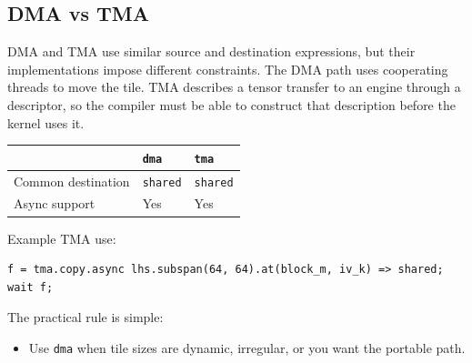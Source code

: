 \subsection*{DMA vs TMA}

DMA and TMA use similar source and destination expressions, but their implementations impose different constraints. The DMA path uses cooperating threads to move the tile. TMA describes a tensor transfer to an engine through a descriptor, so the compiler must be able to construct that description before the kernel uses it.

\begin{table}[htbp]
\centering\small
\begin{tabularx}{\linewidth}{@{}lXX@{}}
\toprule
 & \textbf{\texttt{dma}} & \textbf{\texttt{tma}} \\
\midrule
Common destination & \texttt{shared} & \texttt{shared} \\
Async support & Yes & Yes \\
\bottomrule
\end{tabularx}
\end{table}

Example TMA use:

\begin{lstlisting}[language=croqtile,caption={DMA vs TMA}]
f = tma.copy.async lhs.subspan(64, 64).at(block_m, iv_k) => shared;
wait f;
\end{lstlisting}

The practical rule is simple:

\begin{itemize}[leftmargin=1.6em]
\item Use \texttt{dma} when tile sizes are dynamic, irregular, or you want the portable path.
\end{itemize}
